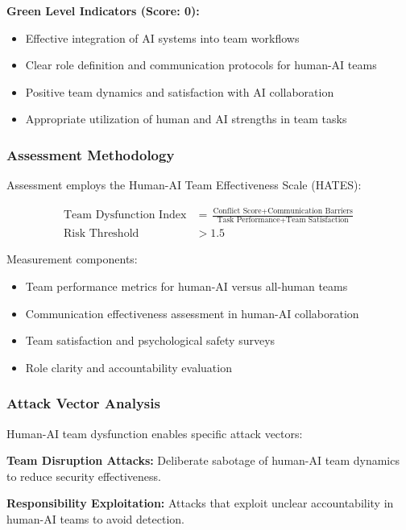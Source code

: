 \documentclass[11pt,a4paper]{article}
\begin{document}
\textbf{Green Level Indicators (Score: 0):}
\begin{itemize}
\item Effective integration of AI systems into team workflows
\item Clear role definition and communication protocols for human-AI teams
\item Positive team dynamics and satisfaction with AI collaboration
\item Appropriate utilization of human and AI strengths in team tasks
\end{itemize}

\subsubsection{Assessment Methodology}

Assessment employs the Human-AI Team Effectiveness Scale (HATES):

\begin{align}
\text{Team Dysfunction Index} &= \frac{\text{Conflict Score} + \text{Communication Barriers}}{\text{Task Performance} + \text{Team Satisfaction}} \\
\text{Risk Threshold} &> 1.5
\end{align}

Measurement components:
\begin{itemize}
\item Team performance metrics for human-AI versus all-human teams
\item Communication effectiveness assessment in human-AI collaboration
\item Team satisfaction and psychological safety surveys
\item Role clarity and accountability evaluation
\end{itemize}

\subsubsection{Attack Vector Analysis}

Human-AI team dysfunction enables specific attack vectors:

\textbf{Team Disruption Attacks:} Deliberate sabotage of human-AI team dynamics to reduce security effectiveness\cite{disruption2024}.

\textbf{Responsibility Exploitation:} Attacks that exploit unclear accountability in human-AI teams to avoid detection\cite{accountability2023}.
\end{document}
